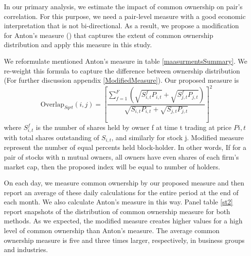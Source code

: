 In our primary analysis, we estimate the impact of common ownership on pair's correlation. For this purpose, we need a pair-level measure with a good economic interpretation that is not bi-directional. As a result, we propose a modification for Anton's measure (\cite{AntonPolk}) that captures the extent of common ownership distribution and apply this measure in this study.

We reformulate mentioned Anton's measure in table \ref{maasurmentsSummary}. We re-weight this formula to capture the difference between ownership distribution ({For further discussion appendix \ref{ModifiedMeasure}}). Our proposed measure is
\begin{equation}
	\text{Overlap}_{Sqrt}(i, j) =  [\frac{\sum_{f =1}^{F}(\sqrt{S^f_{i,t}P_{i,t}}+\sqrt{S^f_{j,t}P_{j,t}})}{\sqrt{S_{i,t}P_{i,t}} + \sqrt{S_{j,t}P_{j,t}}}]^2 
	\label{sqrt}
\end{equation}
where $ S^f_{i,t}$ is the number of shares held by owner f at time t trading at price $ P{i,t} $ with total shares outstanding of $ S_{i,t} $, and similarly for stock j. Modified measure represent the number of equal percents held block-holder. In other words, If for a pair of stocks with n mutual owners, all owners have even shares of each firm's market cap, then the proposed index will be equal to number of holders.

On each day, we measure common ownership by our proposed measure and then report an average of these daily calculations for the entire period at the end of each month. We also calculate Anton's measure in this way. Panel  table \ref{st2} report snapshots of the distribution of common ownership measure for both methods. As we expected, the modified measure creates higher values for a high level of common ownership than Anton's measure. The average common ownership measure is five and three times larger, respectively, in business groups and industries.
%		
		
